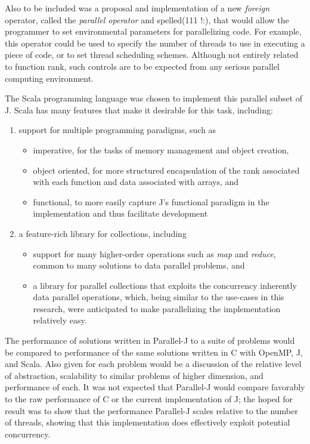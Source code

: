 Also to be included was a proposal and implementation of a new \textit{foreign} operator, called the \textit{parallel operator} and spelled\ttfamily (111 !:)\normalfont , 
that would allow the programmer to set environmental parameters for parallelizing code.
For example, this operator could be used to specify the number of threads to use in executing a piece of code, 
or to set thread scheduling schemes.
Although not entirely related to function rank, such controls are to be expected from any serious parallel computing environment.

The Scala programming language\cite{scala} 
was chosen to implement this parallel subset of J.
Scala has many features that make it desirable for this task, including: 
\begin{enumerate} 
	\item support for multiple programming paradigms, such as
	\begin{itemize}
		\item imperative, for the tasks of memory management and object creation,
		\item object oriented, for more structured encapsulation of the rank associated with each function 
			and data associated with arrays, and
		\item functional, to more easily capture J's functional paradigm in the implementation and thus facilitate development
	\end{itemize}
	\item a feature-rich library for collections, including 
	\begin{itemize}
		\item support for many higher-order operations such as \textit{map} and \textit{reduce}\cite{scala28col}, 
			common to many solutions to data parallel problems, and
		\item a library for parallel collections that exploits the concurrency inherently data parallel operations\cite{pc},
			which, being similar to the use-cases in this research, were anticipated to make parallelizing the implementation relatively easy.
	\end{itemize}
\end{enumerate}

The performance of solutions written in Parallel-J to a suite of problems would be compared to
performance of the same solutions written in C with OpenMP, J, and Scala.
Also given for each problem would be 
a discussion of the relative level of abstraction, scalability to similar problems of higher dimension, and performance of each. 
It was not expected that Parallel-J would compare favorably to the raw performance of C or the current implementation of J; 
the hoped for result was to show that the performance Parallel-J scales relative to the number of threads, 
showing that this implementation does effectively exploit potential concurrency.

